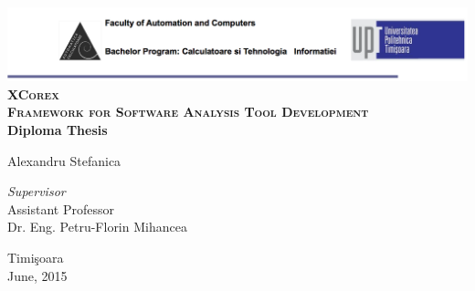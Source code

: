 \begin{titlepage}
	\begin{center}	
		\includegraphics[width=\textwidth]{../img/header.png}\\[4cm]
		
		{\huge \bfseries \textsc{XCorex\\ Framework for Software Analysis Tool
		Development}}
		\\[3cm]
		
		{\bfseries Diploma Thesis} \\[3cm]
						
				
		\begin{flushright}
				\large Alexandru Stefanica \\[1cm]
		\end{flushright}
		\begin{flushleft}
			 \large
				\emph{Supervisor} \\
				Assistant Professor \\
				Dr. Eng. Petru-Florin Mihancea \\[1cm]
		\end{flushleft}
		
		\vfill
		{\large {Timi\c{s}oara \\June, 2015}}
	\end{center}
\end{titlepage}
